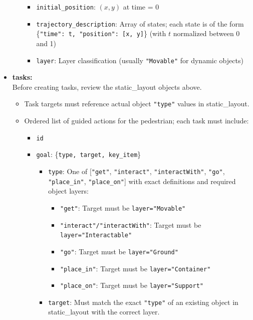 \documentclass{article}
\begin{document}
\begin{tcolorbox}[examplebox, title=Scene Specification Format]
\begin{itemize}
\begin{itemize}
\begin{itemize}
            \item \texttt{initial\_position}: $(x, y)$ at time = 0
            \item \texttt{trajectory\_description}: Array of states; each state is of the form \{\texttt{"time": t, "position": [x, y]}\} (with $t$ normalized between 0 and 1)
            \item \texttt{layer}: Layer classification (usually \texttt{"Movable"} for dynamic objects)
        \end{itemize}
    \end{itemize}
    \item \textbf{tasks:}\\
    Before creating tasks, review the static\_layout objects above.
    \begin{itemize}
        \item Task targets must reference actual object \texttt{"type"} values in static\_layout.
        \item Ordered list of guided actions for the pedestrian; each task must include:
        \begin{itemize}
            \item \texttt{id}
            \item \texttt{goal}: \{\texttt{type, target, key\_item}\}
            \begin{itemize}
                \item \texttt{type}: One of [\texttt{"get"}, \texttt{"interact"}, \texttt{"interactWith"}, \texttt{"go"}, \texttt{"place\_in"}, \texttt{"place\_on"}] with exact definitions and required object layers:
                \begin{itemize}
                    \item \texttt{"get"}: Target must be \texttt{layer="Movable"}
                    \item \texttt{"interact"/"interactWith"}: Target must be \texttt{layer="Interactable"}
                    \item \texttt{"go"}: Target must be \texttt{layer="Ground"}
                    \item \texttt{"place\_in"}: Target must be \texttt{layer="Container"}
                    \item \texttt{"place\_on"}: Target must be \texttt{layer="Support"}
                \end{itemize}
                \item \texttt{target}: Must match the exact \texttt{"type"} of an existing object in static\_layout with the correct layer.

\end{itemize}
\end{itemize}
\end{itemize}
\end{itemize}
\end{tcolorbox}
\end{document}
